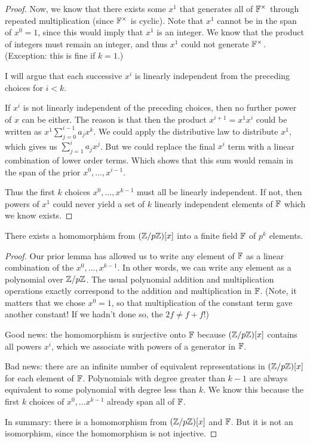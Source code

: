 \begin{proof}
  Now, we know that there exists some $x^1$ that generates all of
  $\mathbb{F}^\times$ through repeated multiplication (since $\mathbb{F}^\times$ is
  cyclic). Note that $x^1$ cannot be in the span of $x^0 = 1$, since
  this would imply that $x^1$ is an integer. We know that the product of
  integers must remain an integer, and thus $x^1$ could not generate
  $\mathbb{F}^\times$. (Exception: this is fine if $k = 1$.)

  I will argue that each successive $x^i$ is linearly independent from
  the preceding choices for $i < k$.

  If $x^i$ is not linearly independent of the preceding choices, then no
  further power of $x$ can be either. The reason is that then the
  product $x^{i+1} = x^1 x^i$ could be written as $x^1 \sum_{j = 0}^{i -
  1} a_j x^k$. We could apply the distributive law to distribute $x^1$,
  which gives us $\sum_{j=1}^{i} a_j x^j$. But we could replace the
  final $x^i$ term with a linear combination of lower order terms. Which
  shows that this sum would remain in the span of the prior $x^0,
  \ldots, x^{i - 1}$.

  Thus the first $k$ choices $x^0, \ldots, x^{k - 1}$ must all be
  linearly independent. If not, then powers of $x^1$ could never yield a
  set of $k$ linearly independent elements of $\mathbb{F}$ which we know exists.
\end{proof}

\begin{lemma}
  There exists a homomorphism from $\mathopen{}\left( {\mathbb{Z} / p\mathbb{Z}} \right)\mathclose{}[x]$ into a finite
  field $\mathbb{F}$ of $p^k$ elements.
\end{lemma}

\begin{proof}
  Our prior lemma has allowed us to write any element of $\mathbb{F}$ as a
  linear combination of the $x^0, \ldots, x^{k-1}$. In other words, we
  can write any element as a polynomial over $\mathbb{Z} / p\mathbb{Z}$. The usual
  polynomial addition and multiplication operations exactly correspond
  to the addition and multiplication in $\mathbb{F}$. (Note, it matters that we
  chose $x^0 = 1$, so that multiplication of the constant term gave
  another constant! If we hadn't done so, the $2f \ne f + f$!)

  Good news: the homomorphism is surjective onto $\mathbb{F}$ because
  $\mathopen{}\left( {\mathbb{Z} / p\mathbb{Z}} \right)\mathclose{}[x]$ contains all powers $x^i$, which we associate
  with powers of a generator in $\mathbb{F}$.

  Bad news: there are an infinite number of equivalent representations
  in $\mathopen{}\left( {\mathbb{Z} / p\mathbb{Z}} \right)\mathclose{}[x]$ for each element of $\mathbb{F}$. Polynomials with
  degree greater than $k-1$ are always equivalent to some polynomial
  with degree less than $k$. We know this because the first $k$ choices
  of $x^0, \ldots x^{k-1}$ already span all of $\mathbb{F}$.

  In summary: there is a homomorphism from $\mathopen{}\left( {\mathbb{Z} / p\mathbb{Z}} \right)\mathclose{}[x]$ and
  $\mathbb{F}$. But it is not an isomorphism, since the homomorphism is not
  injective.
\end{proof}

